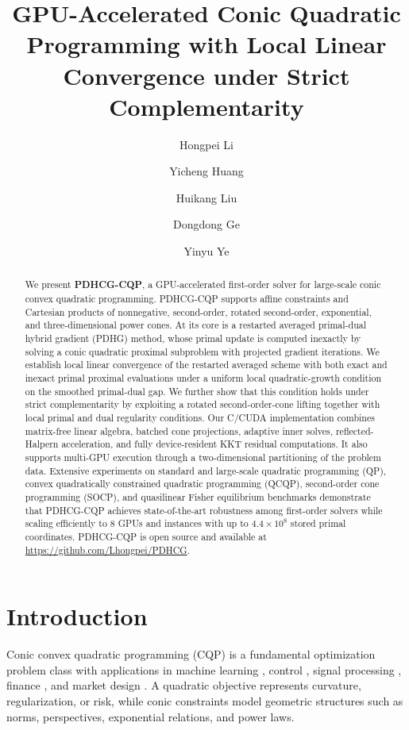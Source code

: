 \documentclass[letterpaper]{article} %
\title{GPU-Accelerated Conic Quadratic Programming with Local Linear Convergence under Strict Complementarity}
\author[1]{Hongpei Li}
\author[2]{Yicheng Huang}
\author[3]{Huikang Liu}
\author[3]{Dongdong Ge}
\author[3,4]{Yinyu Ye}
\affil[1]{Northwestern University}
\affil[2]{Shanghai University of Finance and Economics}
\affil[3]{Shanghai Jiao Tong University}
\affil[4]{Stanford University}
\newcommand{\name}{PDHCG-CQP\xspace}
\theoremstyle{definition}
\theoremstyle{remark}
\begin{document}
\maketitle

\begin{abstract}
We present \textbf{\name}, a GPU-accelerated first-order solver for large-scale conic convex quadratic programming. \name supports affine constraints and Cartesian products of nonnegative, second-order, rotated second-order, exponential, and three-dimensional power cones. At its core is a restarted averaged primal-dual hybrid gradient (PDHG) method, whose primal update is computed inexactly by solving a conic quadratic proximal subproblem with projected gradient iterations. We establish local linear convergence of the restarted averaged scheme with both exact and inexact primal proximal evaluations under a uniform local quadratic-growth condition on the smoothed primal-dual gap. We further show that this condition holds under strict complementarity by exploiting a rotated second-order-cone lifting together with local primal and dual regularity conditions. Our C/CUDA implementation combines matrix-free linear algebra, batched cone projections, adaptive inner solves, reflected-Halpern acceleration, and fully device-resident KKT residual computations. It also supports multi-GPU execution through a two-dimensional partitioning of the problem data. Extensive experiments on standard and large-scale quadratic programming (QP), convex quadratically constrained quadratic programming (QCQP), second-order cone programming (SOCP), and quasilinear Fisher equilibrium benchmarks demonstrate that \name achieves state-of-the-art robustness among first-order solvers while scaling efficiently to 8 GPUs and instances with up to $4.4\times10^8$ stored primal coordinates. \name is open source and available at \url{https://github.com/Lhongpei/PDHCG}.
\end{abstract}


\section{Introduction}

Conic convex quadratic programming (CQP) is a fundamental optimization
problem class with applications in machine learning
\cite{tibshirani1996regression}, control \cite{mayne2000constrained},
signal processing \cite{lobo1998applications}, finance
\cite{markowitz1952portfolio}, and market design
\cite{eisenberg1959consensus}.  A quadratic objective represents
curvature, regularization, or risk, while conic constraints model geometric
structures such as norms, perspectives, exponential relations, and power
laws.
\end{document}

